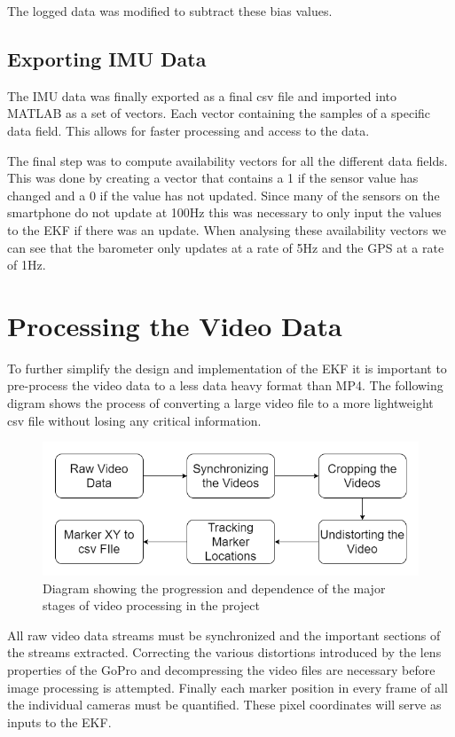 The logged data was modified to subtract these bias values.
 
\subsection{Exporting IMU Data}
The IMU data was finally exported as a final csv file and imported into MATLAB as a set of vectors. Each vector containing the samples of a specific data field. This allows for faster processing and access to the data.

The final step was to compute availability vectors for all the different data fields. This was done by creating a vector that contains a 1 if the sensor value has changed and a 0 if the value has not updated. Since many of the sensors on the smartphone do not update at 100Hz this was necessary to only input the values to the EKF if there was an update. When analysing these availability vectors we can see that the barometer only updates at a rate of 5Hz and the GPS at a rate of 1Hz.

\newpage
\section{Processing the Video Data}
To further simplify the design and implementation of the EKF it is important to pre-process the video data to a less data heavy format than MP4. The following digram shows the process of converting a large video file to a more lightweight csv file without losing any critical information.

\begin{figure}[!ht]
\captionsetup{width=0.8\linewidth, font=small}  
\includegraphics[width=\linewidth]{figures/videoProcess.png}
\caption{Diagram showing the progression and dependence of the major stages of video processing in the project}
\label{fig:videoProcess}
\end{figure}

All raw video data streams must be synchronized and the important sections of the streams extracted. Correcting the various distortions introduced by the lens properties of the GoPro and decompressing the video files are necessary before image processing is attempted. Finally each marker position in every frame of all the individual cameras must be quantified. These pixel coordinates will serve as inputs to the EKF. 

